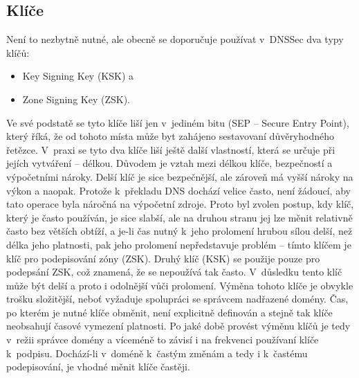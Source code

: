 \subsection{Klíče}
Není to nezbytně nutné, ale obecně se doporučuje používat v~DNSSec dva typy klíčů:
\begin{itemize}
  \item Key Signing Key (KSK) a
  \item Zone Signing Key (ZSK).
\end{itemize}
Ve své podstatě se tyto klíče liší jen v~jediném bitu (SEP -- Secure Entry
Point), který říká, že od tohoto místa může byt zahájeno sestavovaní
důvěryhodného řetězce. V~praxi se tyto dva klíče liší ještě další vlastností,
která se určuje při jejích vytváření -- délkou. Důvodem je vztah mezi délkou
klíče, bezpečností a výpočetními nároky. Delší klíč je sice bezpečnější, ale
zároveň má vyšší nároky na výkon a naopak. Protože k~překladu DNS dochází velice
často, není žádoucí, aby tato operace byla náročná na výpočetní zdroje. Proto
byl zvolen postup, kdy klíč, který je často používán, je sice slabší, ale na
druhou stranu jej lze měnit relativně často bez větších obtíží, a je-li čas
nutný k~jeho prolomení hrubou sílou delší, než délka jeho platnosti, pak jeho prolomení nepředstavuje problém -- tímto klíčem je klíč pro podepisování zóny (ZSK). Druhý klíč (KSK) se použije pouze pro podepsání ZSK, což znamená, že se nepoužívá tak často. V~důsledku tento klíč může být delší a proto i odolnější vůči prolomení. Výměna tohoto klíče je obvykle trošku složitější, neboť vyžaduje spolupráci se správcem nadřazené domény. Čas, po kterém je nutné klíče obměnit, není explicitně definován a stejně tak klíče neobsahují časové vymezení platnosti. Po jaké době provést výměnu klíčů je tedy v~režii správce domény a víceméně to závisí i na frekvenci používaní klíče k~podpisu. Dochází-li v~doméně k~častým změnám a tedy i k~častému podepisování, je vhodné měnit klíče častěji.

